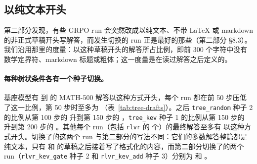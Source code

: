 \begin{table}[t]
\centering\small

\caption{最终策略：准确率（\%），种子均值 $\pm$ 种子间标准差。MATH-500 和 GSM8K：贪心解码。AMC23、AIME24 和 AIME25：温度 0.6 下每题 16 个样本的平均。\texttt{rlvr}：扁平采样（第二部分）。}
\label{tab:tree-acc}
\end{table}

\begin{table}[t]
\centering\small

\caption{每个种子的最终准确率（\%）。每种树状条件的第三个种子是在前两个跑完之后加的。}
\label{tab:tree-seeds}
\end{table}

\begin{table}[t]
\centering\small

\caption{相对 \texttt{tree\_random} 的配对差（百分点）：在每道题上取各条件的种子均值，求差后对题目取平均，并给出按题目重采样的 95\% 区间。\texttt{tree\_kev} 减 \texttt{tree\_random} 分离出评判模型选根的作用；\texttt{rlvr} 减 \texttt{tree\_random} 分离出树形的作用。}
\label{tab:tree-paired}
\end{table}

\subsection{以纯文本开头}\label{sec:res-tree-drafts}

第二部分发现，有些 GRPO run 会突然改成以纯文本、不带 LaTeX 或 markdown 的非正式草稿开头写解答，而发生切换的 run 正是最好的那些（第二部分 \S8.3）。我们沿用那里的度量：以这种草稿开头的解答所占比例，即前 300 个字符中没有数学定界符、markdown 标题或粗体；这一度量是在读过解答之后定义的。

\paragraph{每种树状条件各有一个种子切换。} 基座模型有  到  的 MATH-500 解答以这种方式开头，每个 run 都在前 50 步压低了这一比例，第 50 步时至多为 （表~\ref{tab:tree-drafts}）。之后 \texttt{tree\_random} 种子 2 的比例从第 100 步的  升到第 150 步的 ，\texttt{tree\_kev} 种子 1 的比例从第 150 步的  升到第 200 步的 。其他每个 run（包括 \texttt{rlvr} 的  个）的最终解答至多有  以这种方式开头。切换了的这两个 run 与第二部分的写法不同：它们的多数解答整篇都是纯文本，只有  和  的草稿之后接着写了格式化的内容，而第二部分切换了的两个 run（\texttt{rlvr\_kev\_gate} 种子 2 和 \texttt{rlvr\_kev\_add} 种子 3）分别为  和 。

